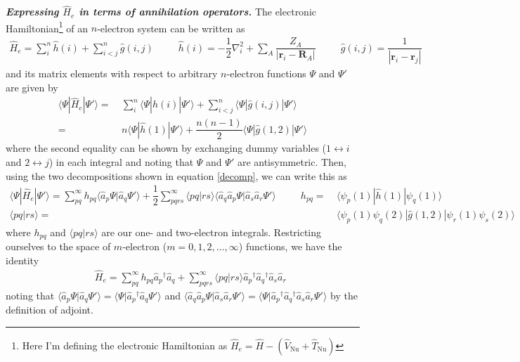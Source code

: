 \documentclass[11pt,fleqn]{article}
\newcommand{\y}{\psi}        %
\newcommand{\Y}{\Psi}        %
\newcommand{\dg}{\ensuremath{^\dagger}}
\newcommand{\op}[1]{\ensuremath{\hat{#1}}}
\renewcommand{\sp}{\hspace{30pt}}
\newcommand{\ld}{\ensuremath{\ldots}}
\newcommand{\bmit}[1]{{\bfseries\itshape\mathversion{bold}#1}}
\newcommand{\bo}[1]{\ensuremath{\mathbf{#1}}}
\newcommand{\fr}[2]{\ensuremath{\dfrac{#1}{#2}}}
\newcommand{\ip}[1]{\ensuremath{\langle#1\rangle}}
\theoremstyle{mystyle}
\begin{document}
\noindent
\bmit{Expressing $\op{H}_e$ in terms of annihilation operators.}
The electronic Hamiltonian\footnote{Here I'm defining the electronic Hamiltonian as $\op{H}_e=\op{H}-(\op{V}_\text{Nu}+\op{T}_\text{Nu})$} of an $n$-electron system can be written as
\begin{align*}
  \op{H}_e
=
  \sum_i^n\op{h}(i)
+
  \sum_{i<j}^n\op{g}(i,j)
\sp
  \op{h}(i)
=
-
  \fr{1}{2}\nabla_i^2
+
  \sum_A \fr{Z_A}{|\bo{r}_i-\bo{R}_A|}
\sp
  \op{g}(i,j)
=
  \fr{1}{|\bo{r}_i-\bo{r}_j|}
\end{align*}
and its matrix elements with respect to arbitrary $n$-electron functions $\Y$ and $\Y'$ are given by
\begin{align*}
  \ip{\Y|\op{H}_e|\Y'}
=&\
  \sum_i^n\ip{\Y|\op{h}(i)|\Y'}
+
  \sum_{i<j}^n\ip{\Y|\op{g}(i,j)|\Y'}
\\=&\
  n\ip{\Y|\op{h}(1)|\Y'}
+
  \fr{n(n-1)}{2}\ip{\Y|\op{g}(1,2)|\Y'}
\end{align*}
where the second equality can be shown by exchanging dummy variables ($1\leftrightarrow i$ and $2\leftrightarrow j$) in each integral and noting that $\Y$ and $\Y'$ are antisymmetric.
Then, using the two decompositions shown in equation \ref{decomp}, we can write this as
\begin{align*}
  \ip{\Y|\op{H}_e|\Y'}
=
  \sum_{pq}^\infty h_{pq} \ip{\op{a}_p\Y|\op{a}_q\Y'}
+
  \fr{1}{2}
  \sum_{pqrs}^\infty \ip{pq|rs} \ip{\op{a}_q\op{a}_p\Y|\op{a}_s\op{a}_r\Y'}
\sp
  h_{pq}
=&\
  \ip{\y_p(1)|\op{h}(1)|\y_q(1)}
\\
  \ip{pq|rs}
=&\
  \ip{\y_p(1)\y_q(2)|\op{g}(1,2)|\y_r(1)\y_s(2)}
\end{align*}
where $h_{pq}$ and $\ip{pq|rs}$ are our one- and two-electron integrals.
Restricting ourselves to the space of $m$-electron ($m=0,1,2,\ld,\infty$) functions, we have the identity
\begin{align}
&&
  \op{H}_e
=
  \sum_{pq}^\infty
  h_{pq}
  \op{a}_p\dg \op{a}_q
+
  \sum_{pqrs}^\infty
  \ip{pq|rs}
  \op{a}_p\dg \op{a}_q\dg \op{a}_s\op{a}_r
\end{align}
noting that $\ip{\op{a}_p\Y|\op{a}_q\Y'}=\ip{\Y|\op{a}_p\dg\op{a}_q\Y'}$ and $\ip{\op{a}_q\op{a}_p\Y|\op{a}_s\op{a}_r\Y'}=\ip{\Y|\op{a}_p\dg \op{a}_q\dg \op{a}_s\op{a}_r\Y'}$ by the definition of adjoint.\\
\end{document}
